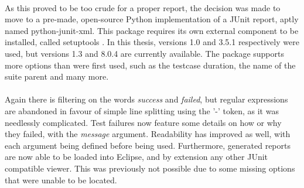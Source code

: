 \documentclass[11pt,british]{article}
\begin{document}
\\
As this proved to be too crude for a proper report, the decision was made to move to a pre-made, open-source Python implementation of a JUnit report, aptly named python-junit-xml.\cite{junitxml} This package requires its own external component to be installed, called setuptools \cite{setuptools}. In this thesis, versions 1.0 and 3.5.1 respectively were used, but versions 1.3 and 8.0.4 are currently available. The package supports more options than were first used, such as the testcase duration, the name of the suite parent and many more.\\
\\
Again there is filtering on the words \emph{success} and \emph{failed}, but regular expressions are abandoned in favour of simple line splitting using the '-' token, as it was needlessly complicated. Test failures now feature some details on how or why they failed, with the \emph{message} argument. Readability has improved as well, with each argument being defined before being used. Furthermore, generated reports are now able to be loaded into Eclipse, and by extension any other JUnit compatible viewer. This was previously not possible due to some missing options that were unable to be located.
\end{document}
